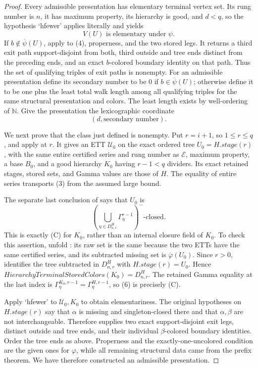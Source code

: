 \begin{proof}
Every admissible presentation has elementary terminal vertex set.  Its
rung number is $n$, it has maximum property, its hierarchy is good, and
$d<q$, so the hypothesis `hfewer' applies literally and yields
\[
                    V(U)\text{ is elementary under }\psi.      \tag{4}
\]
If $b\notin\overline\psi(U)$, apply
 to (4), properness, and
the two stored legs.  It returns a third exit path support-disjoint from
both, third outside and tree ends distinct from the preceding ends, and
an exact $b$-colored boundary identity on that path.  Thus the set of
qualifying triples of exit paths is nonempty.  For an admissible
presentation define its secondary number to be $0$ if
$b\in\overline\psi(U)$; otherwise define it to be one plus the least
total walk length among all qualifying triples for the same structural
presentation and colors.  The least length exists by well-ordering of
$\mathbb N$.  Give the presentation the lexicographic coordinate
\[
                      (d,\text{secondary number}).             \tag{5}
\]

We next prove that the class just defined is nonempty.  Put
$r=i+1$, so $1\leq r\leq q$, and apply
 at $r$.  It gives an ETT
$\mathcal U_0$ on the exact ordered tree
$U_0=H.\mathit{stage}(r)$, with the same entire certified series and rung
number as $\mathcal E$, maximum property, a base $B_0$, and a good
hierarchy $K_0$ having $r-1<q$ dividers.  Its exact retained stages,
stored sets, and Gamma values are those of $H$.  The equality of entire
series transports (3) from the assumed large bound.

The separate last conclusion of
 says that $U_0$ is
\[
 \left(\bigcup_{\eta\in D^H_{n,r}}\Gamma^{r-1}_\eta\right)^-
 \text{-closed}.                                              \tag{6}
\]
This is exactly (C) for $K_0$, rather than an internal closure field of
$K_0$.  To check this assertion, unfold
: its raw set is the same because
the two ETTs have the same certified series, and its subtracted missing
set is $\overline\varphi(U_0)$.  Since $r>0$,
 identifies the tree subtracted in
$D^H_{n,r}$ with $H.\mathit{stage}(r)=U_0$.  Hence
$\mathit{HierarchyTerminalStoredColors}(K_0)=D^H_{n,r}$.  The retained
Gamma equality at the last index is
$\Gamma^{K_0,r-1}_\eta=\Gamma^{H,r-1}_\eta$, so (6) is precisely (C).

Apply `hfewer' to $\mathcal U_0,K_0$ to obtain elementariness.  The
original hypotheses on $H.\mathit{stage}(r)$ say that $\alpha$ is
missing and singleton-closed there and that $\alpha,\beta$ are not
interchangeable.  Therefore
 supplies two exact
support-disjoint exit legs, distinct outside and tree ends, and their
individual $\beta$-colored boundary identities.  Order the tree ends as
above.  Properness and the exactly-one-uncolored condition are the given
ones for $\varphi$, while all remaining structural data came from the
prefix theorem.  We have therefore constructed an admissible
presentation.


\end{proof}
